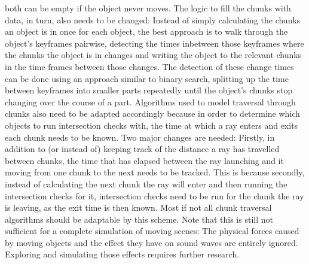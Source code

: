 both can be empty if the object never moves.
\newline
The logic to fill the chunks with data, in turn, also needs to be changed:
Instead of simply calculating the chunks an object is in once for each object,
the best approach is to walk through the object's keyframes pairwise,
detecting the times inbetween those keyframes where the chunks the object is in changes
and writing the object to the relevant chunks in the time frames between those changes.
The detection of these change times can be done using an approach similar to binary search,
splitting up the time between keyframes into smaller parts repeatedly
until the object's chunks stop changing over the course of a part.
\newline
Algorithms used to model traversal through chunks also need to be adapted accordingly
because in order to determine which objects to run intersection checks with,
the time at which a ray enters and exits each chunk needs to be known.
\newline
Two major changes are needed:
Firstly, in addition to (or instead of) keeping track of the distance a ray has travelled between chunks,
the time that has elapsed between the ray launching and it moving from one chunk to the next needs to be tracked.
This is because secondly, instead of calculating the next chunk the ray will enter and then running the intersection checks for it,
intersection checks need to be run for the chunk the ray is leaving, as the exit time is then known.
\newline
Most if not all chunk traversal algorithms should be adaptable by this scheme.
\newline
Note that this is still not sufficient for a complete simulation of moving scenes:
The physical forces caused by moving objects and the effect they have on sound waves are entirely ignored.
Exploring and simulating those effects requires further research.
